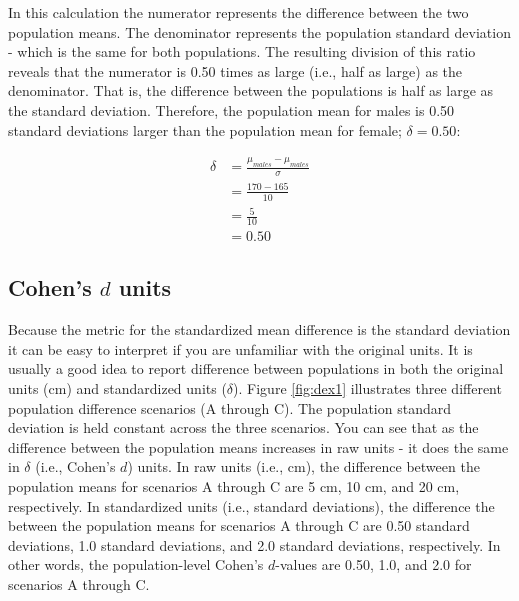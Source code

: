 \documentclass[
]{krantz}
\begin{document}
In this calculation the numerator represents the difference between the two population means. The denominator represents the population standard deviation - which is the same for both populations. The resulting division of this ratio reveals that the numerator is 0.50 times as large (i.e., half as large) as the denominator. That is, the difference between the populations is half as large as the standard deviation. Therefore, the population mean for males is 0.50 standard deviations larger than the population mean for female; \(\delta = 0.50\):

\[
\begin{aligned} 
\delta &=  \frac{\mu_{males} - \mu_{males}}{\sigma}\\ 
&=  \frac{170 - 165}{10}\\
&=  \frac{5}{10}\\
&= 0.50
\end{aligned} 
\]

\hypertarget{cohens-d-units}{%
\subsection{\texorpdfstring{Cohen's \(d\) units}{Cohen's d units}}\label{cohens-d-units}}

Because the metric for the standardized mean difference is the standard deviation it can be easy to interpret if you are unfamiliar with the original units. It is usually a good idea to report difference between populations in both the original units (cm) and standardized units (\(\delta\)). Figure \ref{fig:dex1} illustrates three different population difference scenarios (A through C). The population standard deviation is held constant across the three scenarios. You can see that as the difference between the population means increases in raw units - it does the same in \(\delta\) (i.e., Cohen's \(d\)) units. In raw units (i.e., cm), the difference between the population means for scenarios A through C are 5 cm, 10 cm, and 20 cm, respectively. In standardized units (i.e., standard deviations), the difference the between the population means for scenarios A through C are 0.50 standard deviations, 1.0 standard deviations, and 2.0 standard deviations, respectively. In other words, the population-level Cohen's \(d\)-values are 0.50, 1.0, and 2.0 for scenarios A through C.
\end{document}
